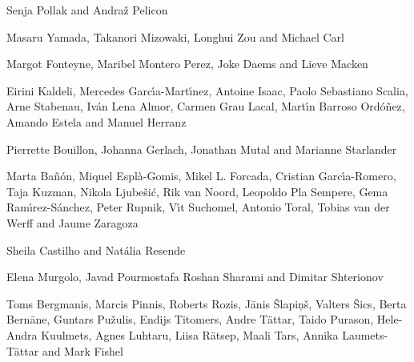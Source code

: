 %
    {Senja Pollak and Andra\v{z} Pelicon}

%
    {Masaru Yamada, Takanori Mizowaki, Longhui Zou and Michael Carl}

%
    {Margot Fonteyne, Maribel Montero Perez, Joke Daems and Lieve Macken}

%
    {Eirini Kaldeli, Mercedes Garc\'{\i}a-Mart\'{\i}nez, Antoine Isaac, Paolo Sebastiano Scalia, Arne Stabenau, Iv\'{a}n Lena Almor, Carmen Grau Lacal, Mart\'{\i}n Barroso Ord\'{o}\~{n}ez, Amando Estela and Manuel Herranz}

%
    {Pierrette Bouillon, Johanna Gerlach, Jonathan Mutal and Marianne Starlander}

%
    {Marta Ba\~{n}\'{o}n, Miquel Espl\`{a}-Gomis, Mikel L. Forcada, Cristian Garc\'{\i}a-Romero, Taja Kuzman, Nikola Ljube\v{s}i\'{c}, Rik van Noord, Leopoldo Pla Sempere, Gema Ram\'{\i}rez-S\'{a}nchez, Peter Rupnik, V\'{\i}t Suchomel, Antonio Toral, Tobias van der Werff and Jaume Zaragoza}

%
    {Sheila Castilho and Nat\'{a}lia Resende}

%
    {Elena Murgolo, Javad Pourmostafa Roshan Sharami and Dimitar Shterionov}

%
    {Toms Bergmanis, Marcis Pinnis, Roberts Rozis, J\={a}nis \v{S}lapi\c{n}\v{s}, Valters \v{S}ics, Berta Bern\={a}ne, Guntars Pu\v{z}ulis, Endijs Titomers, Andre T\"{a}ttar, Taido Purason, Hele-Andra Kuulmets, Agnes Luhtaru, Liisa R\"{a}tsep, Maali Tars, Annika Laumets-T\"{a}ttar and Mark Fishel}


